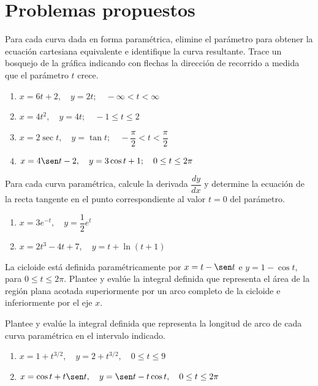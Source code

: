 \section{Problemas propuestos}



\begin{prob}
Para cada curva dada en forma paramétrica, elimine el parámetro para obtener
la ecuación cartesiana equivalente e identifique la curva resultante. Trace un
bosquejo de la gráfica indicando con flechas la dirección de recorrido a medida
que el parámetro $t$ crece.
\begin{enumerate}
    \item $x = 6t + 2,\quad y = 2t;\quad -\infty < t < \infty$
    \item $x = 4t^2,\quad y = 4t;\quad -1 \leq t \leq 2$
    \item $x = 2\sec t,\quad y = \tan t;\quad
          -\dfrac{\pi}{2} < t < \dfrac{\pi}{2}$
    \item $x = 4\sen t - 2,\quad y = 3\cos t + 1;\quad 0 \leq t \leq 2\pi$
\end{enumerate}
\end{prob}

\begin{prob}
Para cada curva paramétrica, calcule la derivada $\dfrac{dy}{dx}$ y determine
la ecuación de la recta tangente en el punto correspondiente al valor $t = 0$
del parámetro.
\begin{enumerate}
    \item $x = 3e^{-t},\quad y = \dfrac{1}{2}e^{t}$
    \item $x = 2t^3 - 4t + 7,\quad y = t + \ln(t + 1)$
\end{enumerate}
\end{prob}


\begin{prob}
La cicloide está definida paramétricamente por $x = t - \sen t$ e
$y = 1 - \cos t$, para $0 \leq t \leq 2\pi$. Plantee y evalúe la integral
definida que representa el área de la región plana acotada superiormente
por un arco completo de la cicloide e inferiormente por el eje $x$.
\end{prob}

\begin{prob}
Plantee y evalúe la integral definida que representa la longitud de arco de
cada curva paramétrica en el intervalo indicado.
\begin{enumerate}
    \item $x = 1 + t^{3/2},\quad y = 2 + t^{3/2},\quad 0 \leq t \leq 9$
    \item $x = \cos t + t\sen t,\quad y = \sen t - t\cos t,\quad
          0 \leq t \leq 2\pi$
\end{enumerate}
\end{prob}

